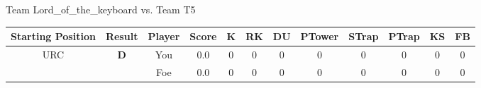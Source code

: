 \documentclass[a4paper,12pt]{article}
\begin{document}
  \vspace*{2em}
  \par {\large {\color{Gray} Team} Lord\_of\_the\_keyboard {\color{Gray}
      vs. Team} T5}
  \newline
  \begin{tabular}[t]{| c | c | c | c | c | c | c | c | c | c | c | c
      |}
    \hline
    Starting Position & \textbf{Result} & Player & \textbf{Score} & K & RK & DU & PTower & STrap & PTrap & KS & FB \\
    
      
                      
      
                      
      
                      
      
                      
      
                      
      
                      
      
        \hline
        \multirow{2}{*}{  URC
             } &
              \multirow{2}{*}{  
                  \textbf{D}  } & 
                    \cellcolor{yellow!25} You & \cellcolor{yellow!25} 0.0 & \cellcolor{yellow!25} 0 &
                    \cellcolor{yellow!25} 0 & \cellcolor{yellow!25} 0 & \cellcolor{yellow!25} 0 &
                    \cellcolor{yellow!25} 0 & \cellcolor{yellow!25} 0 & \cellcolor{yellow!25} 0 &
                    \cellcolor{yellow!25} 0 \\
                    \cline{3-12}
                    & & \cellcolor{red!15} Foe & \cellcolor{red!15} 0.0 & \cellcolor{red!15} 0 & \cellcolor{red!15}
                    0 & \cellcolor{red!15} 0
                    & \cellcolor{red!15} 0 & \cellcolor{red!15}
                    0 & \cellcolor{red!15} 0 
                    & \cellcolor{red!15} 0 & \cellcolor{red!15}
                    0 \\
                    
                      
      
                      
      
                      
      
                      
      
                      
      
                      
      
                      
      

\end{tabular}
\end{document}
